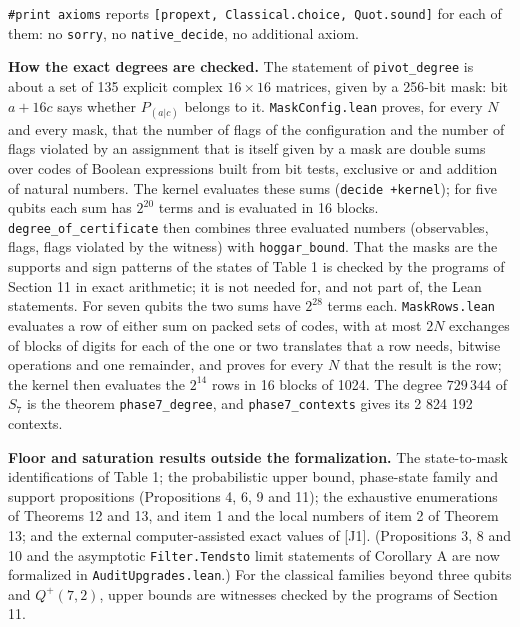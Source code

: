 \documentclass[11pt,a4paper]{article}
\begin{document}
\texttt{\#print\ axioms} reports \texttt{{[}propext,\ Classical.choice,\ Quot.sound{]}} for each of them: no \texttt{sorry}, no
\texttt{native\_decide}, no additional axiom.

\textbf{How the exact degrees are checked.} The statement of \texttt{pivot\_degree} is about a set of 135 explicit
complex \(16 \times 16\) matrices, given by a 256-bit mask: bit \(a + 16c\) says whether \(P_{(a|c)}\) belongs to
it. \texttt{MaskConfig.lean} proves, for every \(N\) and every mask, that the number of flags of the configuration
and the number of flags violated by an assignment that is itself given by a mask are double sums over
codes of Boolean expressions built from bit tests, exclusive or and addition of natural numbers. The
kernel evaluates these sums (\texttt{decide\ +kernel}); for five qubits each sum has \(2^{20}\) terms and is
evaluated in 16 blocks. \nolinkurl{degree_of_certificate} then combines three evaluated numbers (observables,
flags, flags violated by the witness) with \texttt{hoggar\_bound}. That the masks are the supports and sign
patterns of the states of Table 1 is checked by the programs of Section 11 in exact arithmetic; it is
not needed for, and not part of, the Lean statements. For seven qubits the two sums have \(2^{28}\) terms
each. \texttt{MaskRows.lean} evaluates a row of either sum on packed sets of codes, with at most \(2N\) exchanges
of blocks of digits for each of the one or two translates that a row needs, bitwise operations and one
remainder, and proves for every \(N\) that the result is the row; the kernel then evaluates the \(2^{14}\) rows in 16 blocks of 1024. The degree \(729\,344\) of
\(S_7\) is the theorem \texttt{phase7\_degree}, and \texttt{phase7\_contexts} gives its 2 824 192 contexts.

\textbf{Floor and saturation results outside the formalization.} The state-to-mask identifications of Table 1;
the probabilistic upper bound, phase-state family and support propositions (Propositions 4, 6, 9 and 11);
the exhaustive enumerations of Theorems 12 and 13, and item 1 and the local numbers of item 2 of Theorem 13;
and the external computer-assisted exact values of {[}J1{]}. (Propositions 3, 8 and 10 and the asymptotic
\texttt{Filter.Tendsto} limit statements of Corollary A are now formalized in \nolinkurl{AuditUpgrades.lean}.) For the
classical families beyond three qubits and \(Q^+(7,2)\), upper bounds are witnesses checked by the programs of
Section 11.
\end{document}
